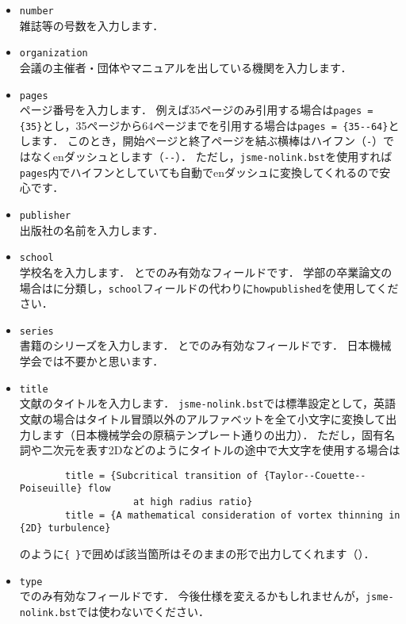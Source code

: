 \documentclass[a4paper,fleqn,uplatex,dvipdfmx]{jsarticle}
\newcommand{\jsmefile}{\texttt{jsme-nolink.bst}}
\begin{document}
\begin{itemize}
    \item \verb|number| \\
        雑誌等の号数を入力します．
    \item \verb|organization| \\
        会議の主催者・団体やマニュアルを出している機関を入力します．
    \item \verb|pages| \\
        ページ番号を入力します．
        例えば35ページのみ引用する場合は\verb|pages = {35}|とし，35ページから64ページまでを引用する場合は\verb|pages = {35--64}|とします．
        このとき，開始ページと終了ページを結ぶ横棒はハイフン（\verb|-|）ではなくenダッシュとします（\verb|--|）．
        ただし，\jsmefile を使用すれば\verb|pages|内でハイフンとしていても自動でenダッシュに変換してくれるので安心です．
    \item \verb|publisher| \\
        出版社の名前を入力します．
    \item \verb|school| \\
        学校名を入力します．
        \ttmastersthesis と\ttphdthesis でのみ有効なフィールドです．
        学部の卒業論文の場合は\ttmisc に分類し，\verb|school|フィールドの代わりに\verb|howpublished|を使用してください．
    \item \verb|series| \\
        書籍のシリーズを入力します．
        \ttbook と\ttinbook でのみ有効なフィールドです．
        日本機械学会では不要かと思います．
    \item \verb|title| \\
        文献のタイトルを入力します．
        \jsmefile では標準設定として，英語文献の場合はタイトル冒頭以外のアルファベットを全て小文字に変換して出力します（日本機械学会の原稿テンプレート通りの出力）．
        ただし，固有名詞や二次元を表す2Dなどのようにタイトルの途中で大文字を使用する場合は
        \begin{verbatim}
        title = {Subcritical transition of {Taylor--Couette--Poiseuille} flow 
                    at high radius ratio}
        title = {A mathematical consideration of vortex thinning in {2D} turbulence}
        \end{verbatim}
        のように\verb|{ }|で囲めば該当箇所はそのままの形で出力してくれます（\citealp{Matsukawa:PoF2022,Yoneda:arXiv2016}）．
    \item \verb|type| \\
        \tttechreport でのみ有効なフィールドです．
        今後仕様を変えるかもしれませんが，\jsmefile では使わないでください．

\end{itemize}
\end{document}
